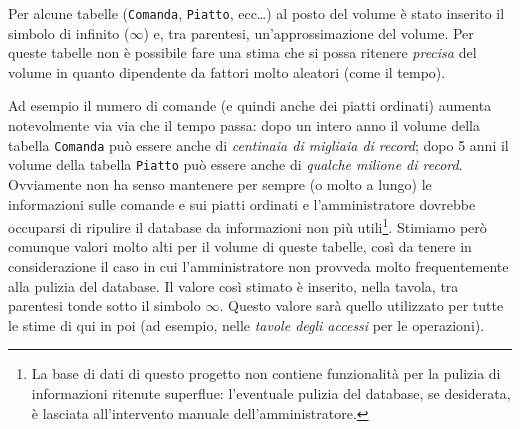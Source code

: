 
Per alcune tabelle ({\tt Comanda}, {\tt Piatto}, ecc\ldots) al posto del volume è stato
inserito il simbolo di infinito (\(\infty\)) e, tra parentesi, un'approssimazione del volume. Per
queste tabelle non è possibile fare una stima che si possa ritenere {\it precisa} del volume in
quanto dipendente da fattori molto aleatori (come il tempo).

Ad esempio il numero di comande (e quindi anche dei piatti ordinati) aumenta notevolmente
via via che il tempo passa: dopo un intero anno il volume della tabella {\tt Comanda} può essere
anche di {\it centinaia di migliaia di record}; dopo 5 anni il volume della tabella {\tt Piatto} può
essere anche di {\it qualche milione di record}. Ovviamente non ha senso mantenere per sempre (o
molto a lungo) le informazioni sulle comande e sui piatti ordinati e l'amministratore
dovrebbe occuparsi di ripulire il database da informazioni non più utili\footnote{La base di %
dati di questo progetto non contiene funzionalità per la pulizia di informazioni %
ritenute superflue: l'eventuale pulizia del database, se desiderata, è lasciata %
all'intervento manuale dell'amministratore.}. Stimiamo però comunque
valori molto alti per il volume di queste tabelle, così da tenere in considerazione il
caso in cui l'amministratore non provveda molto frequentemente alla pulizia del database. Il
valore così stimato è inserito, nella tavola, tra parentesi tonde sotto il simbolo \(\infty\). Questo
valore sarà quello utilizzato per tutte le stime di qui in poi (ad esempio, nelle
{\it tavole degli accessi} per le operazioni).
